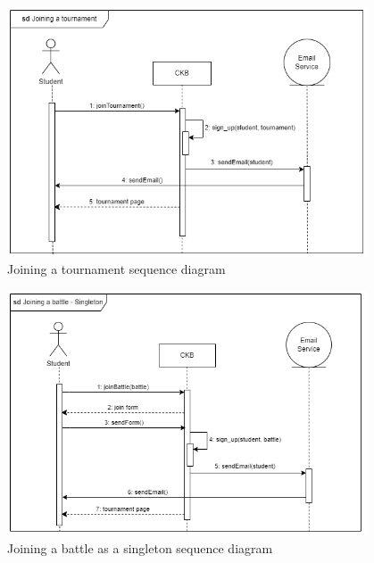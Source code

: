 \begin{figure}[H]
    \centering
    \includegraphics[width=0.95\textwidth]{images/seq_diagrams/joining_tournament.png}
    \caption{Joining a tournament sequence diagram}
\end{figure}
\clearpage

\begin{figure}[H]
    \centering
    \includegraphics[width=0.95\textwidth]{images/seq_diagrams/joining_battle-singleton.png}
    \caption{Joining a battle as a singleton sequence diagram}
\end{figure}
\clearpage

